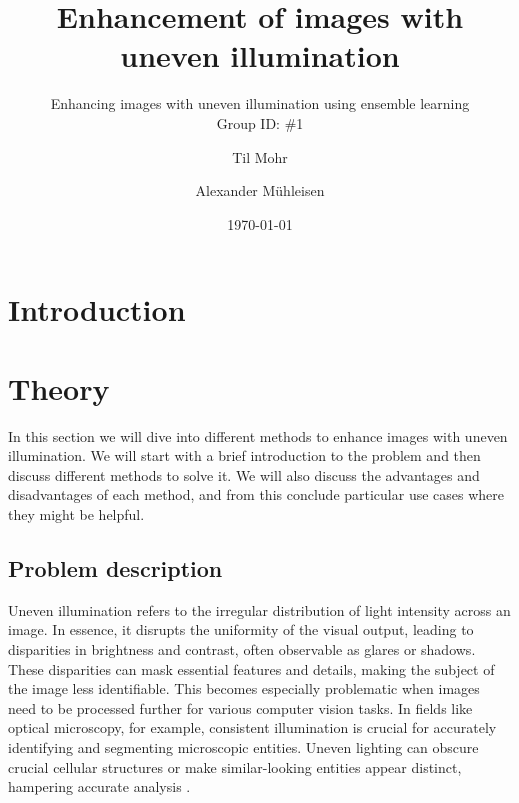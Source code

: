 \documentclass[sigconf]{acmart}
\begin{document}
\title{Enhancement of images with uneven illumination}
\subtitle{Enhancing images with uneven illumination using ensemble learning\\Group ID: \#1}

\author{Til Mohr}
\affiliation{}

\author{Alexander Mühleisen}
\affiliation{}

\date{\today}



\begin{abstract}

\end{abstract}


\renewcommand\footnotetextcopyrightpermission[1]{}
\pagestyle{plain}

\maketitle


\section{Introduction}\label{sec:intro}

\section{Theory}\label{sec:theory}
In this section we will dive into different methods to enhance images with uneven illumination. We will start with a brief introduction to the problem and then discuss different methods to solve it. We will also discuss the advantages and disadvantages of each method, and from this conclude particular use cases where they might be helpful.

\subsection{Problem description}\label{sec:problem}
Uneven illumination refers to the irregular distribution of light intensity across an image. In essence, it disrupts the uniformity of the visual output, leading to disparities in brightness and contrast, often observable as glares or shadows. These disparities can mask essential features and details, making the subject of the image less identifiable. This becomes especially problematic when images need to be processed further for various computer vision tasks. In fields like optical microscopy, for example, consistent illumination is crucial for accurately identifying and segmenting microscopic entities. Uneven lighting can obscure crucial cellular structures or make similar-looking entities appear distinct, hampering accurate analysis \cite{dey2019uneven}.
\end{document}
